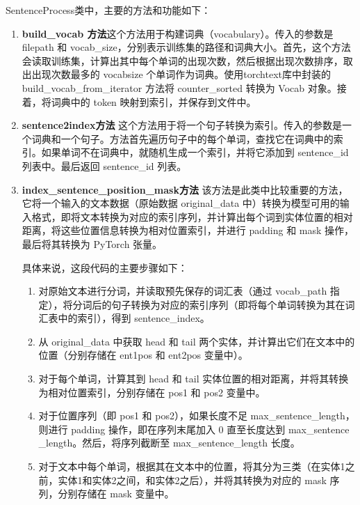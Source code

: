 \documentclass{report}
\begin{document}
	SentenceProcess类中，主要的方法和功能如下：
	
	\begin{enumerate}
		\item \textbf{build\_vocab 方法}\quad 这个方法用于构建词典（vocabulary）。传入的参数是 filepath 和 vocab\_size，分别表示训练集的路径和词典大小。首先，这个方法会读取训练集，计算出其中每个单词的出现次数，然后根据出现次数排序，取出出现次数最多的 vocabsize 个单词作为词典。使用torchtext库中封装的 build\_vocab\_from\_iterator 方法将 counter\_sorted 转换为 Vocab 对象。接着，将词典中的 token 映射到索引，并保存到文件中。
		
		\item \textbf{sentence2index方法} \quad 这个方法用于将一个句子转换为索引。传入的参数是一个词典和一个句子。方法首先遍历句子中的每个单词，查找它在词典中的索引。如果单词不在词典中，就随机生成一个索引，并将它添加到 sentence\_id 列表中。最后返回 sentence\_id 列表。
		
		\item \textbf{index\_sentence\_position\_mask方法} \quad 该方法是此类中比较重要的方法，它将一个输入的文本数据（原始数据 original\_data 中）转换为模型可用的输入格式，即将文本转换为对应的索引序列，并计算出每个词到实体位置的相对距离，将这些位置信息转换为相对位置索引，并进行 padding 和 mask 操作，最后将其转换为 PyTorch 张量。
		
		具体来说，这段代码的主要步骤如下：
		
		\begin{enumerate}
			\item 对原始文本进行分词，并读取预先保存的词汇表（通过 vocab\_path 指定），将分词后的句子转换为对应的索引序列（即将每个单词转换为其在词汇表中的索引），得到 sentence\_index。
			
			\item 从 original\_data 中获取 head 和 tail 两个实体，并计算出它们在文本中的位置（分别存储在 ent1pos 和 ent2pos 变量中）。
			
			\item 对于每个单词，计算其到 head 和 tail 实体位置的相对距离，并将其转换为相对位置索引，分别存储在 pos1 和 pos2 变量中。
			
			\item 对于位置序列（即 pos1 和 pos2），如果长度不足 max\_sentence\_length，则进行 padding 操作，即在序列末尾加入 0 直至长度达到 max\_sentence\\\_length。然后，将序列截断至 max\_sentence\_length 长度。
			
			\item 对于文本中每个单词，根据其在文本中的位置，将其分为三类（在实体1之前，实体1和实体2之间，和实体2之后），并将其转换为对应的 mask 序列，分别存储在 mask 变量中。
			

\end{enumerate}
\end{enumerate}
\end{document}
